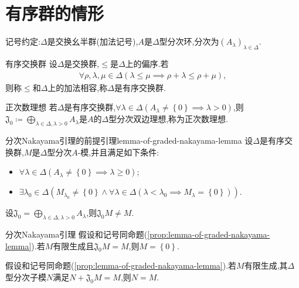 \section{有序群的情形}

记号约定:$\Delta$是交换幺半群(加法记号),$A$是$\Delta$型分次环,分次为$\left(A_{\lambda}\right)_{\lambda\in\Delta}$.

\begin{definition}{有序交换群}{}
	设$\Delta$是交换群,$\leqslant$是$\Delta$上的偏序.若
	\begin{align*}
		\forall\rho,\lambda,\mu\in\Delta\left(\lambda\leqslant\mu\implies\rho+\lambda\leqslant\rho+\mu\right),
	\end{align*}
	则称$\leqslant$和$\Delta$上的加法相容,称$\Delta$是有序交换群.
\end{definition}

\begin{definition}{正次数理想}{}
	若$\Delta$是有序交换群,$\forall\lambda\in\Delta\left(A_{\lambda}\neq\left\{0\right\}\implies\lambda >0\right)$,则$\mathfrak{J}_{0}\coloneq\bigoplus\limits_{\lambda\in\Delta,\lambda>0}A_{\lambda}$是$A$的$\Delta$型分次双边理想,称为正次数理想.
\end{definition}

\begin{proposition}{分次Nakayama引理的前提引理}{lemma-of-graded-nakayama-lemma}
	设$\Delta$是有序交换群,$M$是$\Delta$型分次$A$-模,并且满足如下条件:
	\begin{itemize}
		\item $\forall\lambda\in\Delta\left(A_{\lambda}\neq\left\{0\right\}\implies\lambda\geq 0\right)$;
		\item $\exists\lambda_{0}\in\Delta\left(M_{\lambda_{0}}\neq\left\{0\right\}\wedge\forall\lambda\in\Delta\left(\lambda<\lambda_{0}\implies M_{\lambda}=\left\{0\right\}\right)\right)$.
	\end{itemize}
	设$\mathfrak{J}_{0}=\bigoplus\limits_{\lambda\in\Delta,\lambda>0}A_{\lambda}$,则$\mathfrak{J}_{0}M\neq M$.
\end{proposition}

\begin{corollary}{分次Nakayama引理}{}
	假设和记号同命题(\ref{prop:lemma-of-graded-nakayama-lemma}).若$M$有限生成且$\mathfrak{J}_{0}M=M$,则$M=\left\{0\right\}$.
\end{corollary}

\begin{corollary}{}{}
	假设和记号同命题(\ref{prop:lemma-of-graded-nakayama-lemma}).若$M$有限生成,其$\Delta$型分次子模$N$满足$N+\mathfrak{J}_{0}M=M$,则$N=M$.
\end{corollary}

